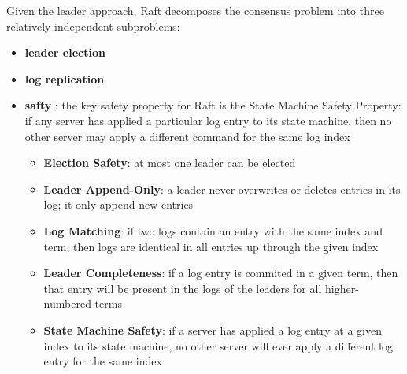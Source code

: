 \documentclass[11pt]{article}
\begin{document}
Given the leader approach, Raft decomposes the consensus problem into three relatively
independent subproblems:
\begin{itemize}
\item \textbf{leader election}
\item \textbf{log replication}
\item \textbf{safty} : the key safety property for Raft is the State Machine Safety Property: if any server
has applied a particular log entry to its state machine, then no other server may apply a
different command for the same log index
\begin{itemize}
\item \textbf{Election Safety}: at most one leader can be elected
\item \textbf{Leader Append-Only}: a leader never overwrites or deletes entries in its log; it only append
new entries
\item \textbf{Log Matching}: if two logs contain an entry with the same index and term, then logs are
identical in all entries up through the given index
\item \textbf{Leader Completeness}: if a log entry is commited in a given term, then that entry will be
present in the logs of the leaders for all higher-numbered terms
\item \textbf{State Machine Safety}: if a server has applied a log entry at a given index to its state
machine, no other server will ever apply a different log entry for the same index
\end{itemize}
\end{itemize}
\end{document}
